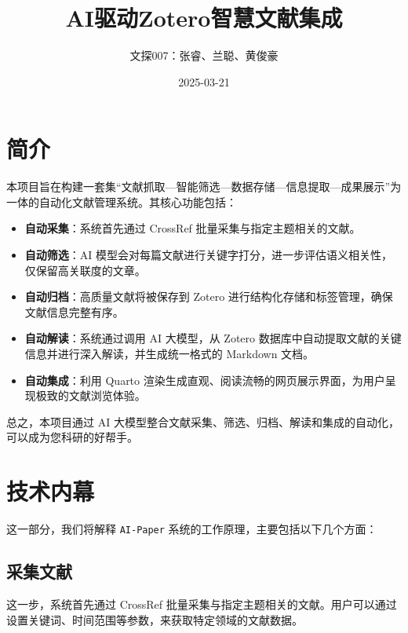 \documentclass[
  letterpaper,
  DIV=11,
  numbers=noendperiod]{scrreprt}
\title{AI驱动Zotero智慧文献集成}
\author{文探007：张睿、兰聪、黄俊豪}
\date{2025-03-21}
\renewcommand*\contentsname{Table of contents}
\newcommand\contentsname{Table of contents}
\begin{document}
\maketitle

\renewcommand*\contentsname{Table of contents}
{
\hypersetup{linkcolor=}
\setcounter{tocdepth}{2}
\tableofcontents
}


\chapter{简介}\label{ux7b80ux4ecb}

本项目旨在构建一套集``文献抓取---智能筛选---数据存储---信息提取---成果展示''为一体的自动化文献管理系统。其核心功能包括：

\begin{itemize}
\item
  \textbf{自动采集}：系统首先通过 CrossRef
  批量采集与指定主题相关的文献。
\item
  \textbf{自动筛选}：AI
  模型会对每篇文献进行关键字打分，进一步评估语义相关性，仅保留高关联度的文章。
\item
  \textbf{自动归档}：高质量文献将被保存到 Zotero
  进行结构化存储和标签管理，确保文献信息完整有序。
\item
  \textbf{自动解读}：系统通过调用 AI 大模型，从 Zotero
  数据库中自动提取文献的关键信息并进行深入解读，并生成统一格式的
  Markdown 文档。
\item
  \textbf{自动集成}：利用 Quarto
  渲染生成直观、阅读流畅的网页展示界面，为用户呈现极致的文献浏览体验。
\end{itemize}

总之，本项目通过 AI
大模型整合文献采集、筛选、归档、解读和集成的自动化，可以成为您科研的好帮手。


\chapter{技术内幕}\label{ux6280ux672fux5185ux5e55}

这一部分，我们将解释 \texttt{AI-Paper}
系统的工作原理，主要包括以下几个方面：

\section{采集文献}\label{ux91c7ux96c6ux6587ux732e}

这一步，系统首先通过 CrossRef
批量采集与指定主题相关的文献。用户可以通过设置关键词、时间范围等参数，来获取特定领域的文献数据。
\end{document}
